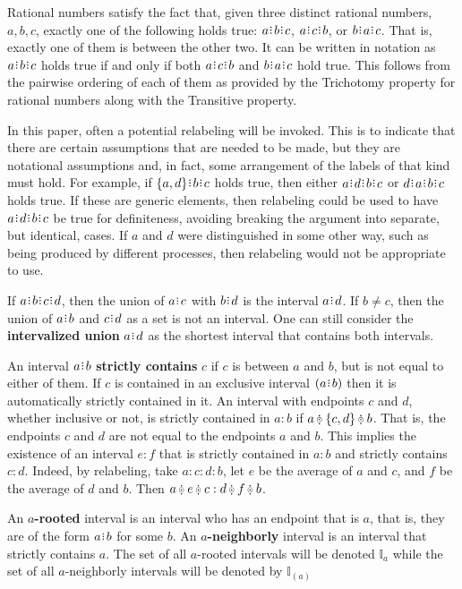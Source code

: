 \documentclass[12pt]{article}
\begin{document}
Rational numbers satisfy the fact that, given three distinct rational numbers, $a, b, c$, exactly one of the following holds true:  $a\rint b\rint c$, $a\rint c\rint b$, or $b\rint a\rint c$. That is, exactly one of them is between the other two. It can be written in notation as $a\rint b\rint c$ holds true if and only if both \sout{$a\rint c\rint b$} and \sout{$b\rint a\rint c$} hold true. This follows from the pairwise ordering of each of them as provided by the Trichotomy property for rational numbers along with the Transitive property. 

In this paper, often a potential relabeling will be invoked. This is to indicate that there are certain assumptions that are needed to be made, but they are notational assumptions and, in fact, some arrangement of the labels of that kind must hold. For example, if $\{a,d\}\rint b\rint c$ holds true, then either $a\rint d\rint b\rint c$ or $d\rint a\rint b\rint c$ holds true. If these are generic elements, then relabeling could be used to have $a\rint d\rint b\rint c$  be  true for definiteness, avoiding breaking the argument into separate, but identical, cases. If $a$ and $d$ were distinguished in some other way, such as being produced by different processes, then relabeling would not be appropriate to use. 

If $a\rint b\rint c\rint d$, then the union of $a\rint c$ with $b\rint d$ is the interval $a\rint d$. If $b \neq c$, then the union of $a\rint b$ and $c\rint d$ as a set is not an interval. One can still consider the \textbf{intervalized union} $a\rint d$ as the shortest interval that contains both intervals. 

An interval $a\rint b$ \textbf{strictly contains} $c$ if $c$ is between $a$ and $b$, but is not equal to either of them. If $c$ is contained in an exclusive interval $(a\rint b)$ then it is automatically strictly contained in it. An interval with endpoints $c$ and $d$, whether inclusive or not, is strictly contained in $a:b$ if $a \betneq \{c, d\} \betneq b$. That is, the endpoints $c$ and $d$ are not equal to the endpoints $a$ and $b$. This implies the existence of an interval $e:f$ that is strictly contained in $a:b$ and strictly contains $c:d$. Indeed, by relabeling, take $a:c:d:b$, let $e$ be the average of $a$ and $c$, and $f$ be the average of $d$ and $b$. Then $a \betneq e \betneq c : d \betneq f \betneq b$.


An \textbf{$a$-rooted} interval is an interval who has an endpoint that is $a$, that is, they are of the form $a\rint b$ for some $b$. An  \textbf{$a$-neighborly} interval is an interval that strictly contains $a$. The set of all $a$-rooted intervals will be denoted $\mathbb{I}_a$ while the set of all $a$-neighborly intervals will be denoted by $\mathbb{I}_{(a)}$
\end{document}
